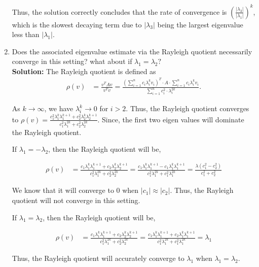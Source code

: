 \documentclass[11pt,onecolumn]{article}
\begin{document}
\begin{enumerate}[label=(\alph*)]
	      Thus, the solution correctly concludes that the rate of convergence is $\left(\frac{|\lambda_3|}{|\lambda_1|}\right)^k$, which is the slowest decaying term due to $|\lambda_3|$ being the largest eigenvalue less than $|\lambda_1|$.

	\item Does the associated eigenvalue estimate via the Rayleigh quotient necessarily converge in this setting? what about if $\lambda_1 = \lambda_2?$ \\
	      \textbf{Solution:}
	      The Rayleigh quotient is defined as
	      \begin{align*}
		      \rho(v) & = \frac{v^TAv}{v^Tv} = \frac{(\sum_{i=1}^n c_i\lambda_i^k v_i)^T \cdot A \cdot \sum_{i=1}^n c_i\lambda_i^k v_i}{\sum_{i=1}^n c_i^2 \cdot \lambda_i^{2k}}.
	      \end{align*}

	      As $k\to\infty$, we have $\lambda_i^k \to 0$ for $i>2$. Thus, the Rayleigh quotient converges to $\rho(v) = \frac{c_1^2\lambda_1^k \lambda_1^{k+1} + c_2^2\lambda_2^k \lambda_2^{k+1}}{c_1^2\lambda_1^{2k} + c_2^2\lambda_2^{2k}}$. Since, the first two eigen values will dominate the Rayleigh quotient.

	      If $\lambda_1 = -\lambda_2$, then the Rayleigh quotient will be,

	      \begin{align*}
		      \rho(v) & = \frac{c_1\lambda_1^k \lambda_1^{k+1} + c_2\lambda_2^k \lambda_2^{k+1}}{c_1^2\lambda_1^{2k} + c_2^2\lambda_2^{2k}} = \frac{c_1\lambda_1^k \lambda_1^{k+1} - c_1\lambda_1^k \lambda_1^{k+1}}{c_1^2\lambda_1^{2k} + c_1^2\lambda_1^{2k}} = \frac{\lambda (c_1^2 - c_2^2)}{c_1^2 + c_2^2}
	      \end{align*}

	      We know that it will converge to $0$ when $|c_1| \approx |c_2|$. Thus, the Rayleigh quotient will not converge in this setting.

	      If $\lambda_1 = \lambda_2$, then the Rayleigh quotient will be,

	      \begin{align*}
		      \rho(v) & = \frac{c_1\lambda_1^k \lambda_1^{k+1} + c_2\lambda_2^k \lambda_2^{k+1}}{c_1^2\lambda_1^{2k} + c_2^2\lambda_2^{2k}} = \frac{c_1\lambda_1^k \lambda_1^{k+1} + c_2\lambda_1^k \lambda_1^{k+1}}{c_1^2\lambda_1^{2k} + c_1^2\lambda_1^{2k}} = \lambda_1
	      \end{align*}

	      Thus, the Rayleigh quotient will accurately converge to $\lambda_1$ when $\lambda_1 = \lambda_2$.
\end{enumerate}
\end{document}
